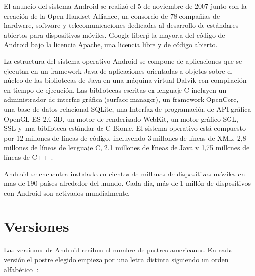 El anuncio del sistema Android se realiz\'o el 5 de noviembre de 2007 junto con la creaci\'on de la Open Handset Alliance, un consorcio de 78 compañ\'ias de hardware, software y telecomunicaciones dedicadas al desarrollo de est\'andares abiertos para dispositivos m\'oviles. Google liber\'p la mayor\'ia del c\'odigo de Android\Si{\texttrademark} bajo la licencia Apache, una licencia libre y de c\'odigo abierto.

La estructura del sistema operativo Android\Si{\texttrademark} se compone de aplicaciones que se ejecutan en un framework Java de aplicaciones orientadas a objetos sobre el núcleo de las bibliotecas de Java en una m\'aquina virtual Dalvik con compilaci\'on en tiempo de ejecuci\'on. Las bibliotecas escritas en lenguaje C incluyen un administrador de interfaz gr\'afica (surface manager), un framework OpenCore, una base de datos relacional SQLite, una Interfaz de programaci\'on de \ac{API} gr\'afica OpenGL ES 2.0 3D, un motor de renderizado WebKit, un motor gr\'afico SGL, SSL y una biblioteca est\'andar de C Bionic. El sistema operativo est\'a compuesto por 12 millones de l\'ineas de c\'odigo, incluyendo 3 millones de l\'ineas de XML, 2,8 millones de l\'ineas de lenguaje C, 2,1 millones de l\'ineas de Java y 1,75 millones de l\'ineas de C++~\cite{wiki.android}.


Android se encuentra instalado en cientos de millones de dispositivos m\'oviles en mas de 190 pa\'ises alrededor del mundo. Cada d\'ia, m\'as de 1 mill\'on de dispositivos con Android son activados mundialmente.

\section{Versiones}
\label{sec:android.versions.1}

Las versiones de Android reciben el nombre de postres americanos. En cada versión el postre elegido empieza por una letra distinta siguiendo un orden alfab\'etico~\cite{and.dev.versions}:

